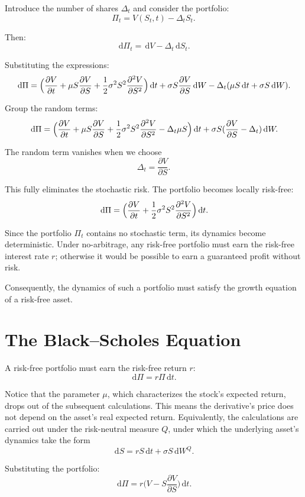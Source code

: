 \documentclass[12pt]{article}
\newcommand{\dd}{\,\mathrm{d}}
\newcommand{\pd}[2]{\frac{\partial #1}{\partial #2}}
\newcommand{\pdd}[2]{\frac{\partial^2 #1}{\partial #2^2}}
\begin{document}
Introduce the number of shares $\Delta_t$ and consider the portfolio:
\[
\Pi_t = V(S_t,t) - \Delta_t S_t.
\]

Then:
\[
\dd \Pi_t = \dd V - \Delta_t \dd S_t.
\]

Substituting the expressions:
\[
\dd \Pi =
\Bigl(\pd{V}{t} + \mu S \pd{V}{S} + \frac{1}{2}\sigma^2 S^2 \pdd{V}{S}\Bigr)\dd t
+ \sigma S \pd{V}{S}\dd W
- \Delta_t(\mu S\dd t + \sigma S\dd W).
\]

Group the random terms:
\[
\dd \Pi =
\Bigl(\pd{V}{t} + \mu S \pd{V}{S}
+ \frac{1}{2}\sigma^2 S^2 \pdd{V}{S}
- \Delta_t\mu S\Bigr)\dd t
+ \sigma S(\pd{V}{S}-\Delta_t)\dd W.
\]

The random term vanishes when we choose
\begin{equation}
\Delta_t=\pd{V}{S}.
\end{equation}

This fully eliminates the stochastic risk. The portfolio becomes locally
risk-free:
\begin{equation}
\dd \Pi =
\Bigl(\pd{V}{t} + \frac{1}{2}\sigma^2 S^2 \pdd{V}{S}\Bigr)\dd t.
\end{equation}

Since the portfolio $\Pi_t$ contains no stochastic term, its dynamics
become deterministic. Under no-arbitrage, any risk-free portfolio must
earn the risk-free interest rate $r$; otherwise it would be possible to
earn a guaranteed profit without risk.

Consequently, the dynamics of such a portfolio must satisfy the growth
equation of a risk-free asset.

\section{The Black--Scholes Equation}

A risk-free portfolio must earn the risk-free return $r$:
\begin{equation}
\dd \Pi = r\Pi \dd t.
\end{equation}

Notice that the parameter $\mu$, which characterizes the stock's expected
return, drops out of the subsequent calculations. This means the
derivative's price does not depend on the asset's real expected return.
Equivalently, the calculations are carried out under the risk-neutral
measure $Q$, under which the underlying asset's dynamics take the form
\[
\dd S = r S \dd t + \sigma S \dd W^Q .
\]

Substituting the portfolio:
\[
\dd \Pi = r\bigl(V - S\pd{V}{S}\bigr)\dd t.
\]
\end{document}
